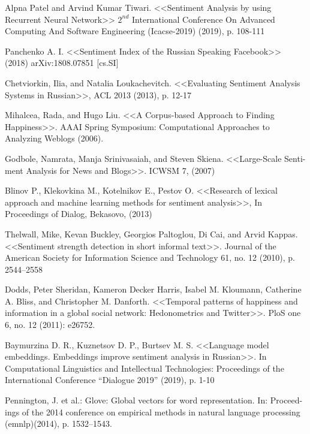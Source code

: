 \documentclass{article}
\begin{document}
\begin{thebibliography}{1}
\newblock Alpna Patel and Arvind Kumar Tiwari.
\newblock <<Sentiment Analysis by using Recurrent Neural Network>>
\newblock $ 2^{nd} $ International Conference On Advanced Computing And Software Engineering (Icacse-2019) (2019), p. 108-111

\newblock Panchenko A. I.
\newblock <<Sentiment Index of the Russian Speaking Facebook>> (2018)
\newblock arXiv:1808.07851 [cs.SI]


\newblock Chetviorkin, Ilia, and Natalia Loukachevitch. <<Evaluating Sentiment Analysis
Systems in Russian>>, ACL 2013 (2013), p. 12-17

\newblock Mihalcea, Rada, and Hugo Liu. <<A Corpus-based Approach to Finding Happiness>>.
AAAI Spring Symposium: Computational Approaches to Analyzing Weblogs (2006).

\newblock Godbole, Namrata, Manja Srinivasaiah, and Steven Skiena. <<Large-Scale Senti- ment Analysis for News and Blogs>>. ICWSM 7, (2007)

\newblock Blinov P., Klekovkina M., Kotelnikov E., Pestov O. <<Research of lexical approach and machine learning methods for sentiment analysis>>, In Proceedings of Dialog,
Bekasovo, (2013)

\newblock Thelwall, Mike, Kevan Buckley, Georgios Paltoglou, Di Cai, and Arvid Kappas.
<<Sentiment strength detection in short informal text>>. Journal of the American
Society for Information Science and Technology 61, no. 12 (2010), p. 2544–2558

\newblock Dodds, Peter Sheridan, Kameron Decker Harris, Isabel M. Kloumann, Catherine A. Bliss,
and Christopher M. Danforth. <<Temporal patterns of happiness and information in a global
social network: Hedonometrics and Twitter>>. PloS one 6, no. 12 (2011): e26752.

\newblock Baymurzina D. R., Kuznetsov D. P., Burtsev M. S.
\newblock <<Language model embeddings. Embeddings improve sentiment analysis in Russian>>.
\newblock In Computational Linguistics and Intellectual Technologies: Proceedings of the International Conference “Dialogue 2019” (2019), p. 1-10 

\newblock Pennington, J. et al.: Glove: Global vectors for word representation. In: Proceed- ings of the 2014 conference on empirical methods in natural language processing (emnlp)(2014), p. 1532–1543.

\end{thebibliography}
\end{document}
